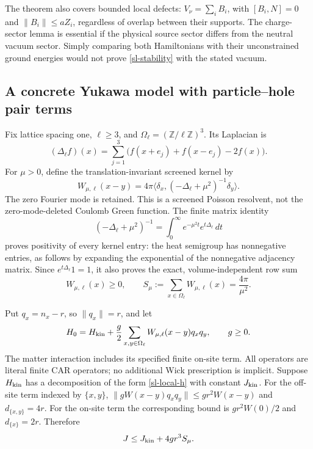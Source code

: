The theorem also covers bounded local defects:
\(V_\nu=\sum_iB_i\), with \([B_i,N]=0\) and
\(\|B_i\|\le aZ_i\), regardless of overlap between their supports.
The charge-sector lemma is essential if the physical source sector
differs from the neutral vacuum sector. Simply comparing both
Hamiltonians with their unconstrained ground energies would not prove
\eqref{sl-stability} with the stated vacuum.

\subsection{A concrete Yukawa model with particle--hole pair terms}
\label{sl-yukawa}

Fix lattice spacing one, \(\ell\ge3\), and
\(\Omega_\ell=(\mathbb Z/\ell\mathbb Z)^3\). Its Laplacian is
\[
(\Delta_\ell f)(x)=\sum_{j=1}^3
\bigl(f(x+e_j)+f(x-e_j)-2f(x)\bigr).
\]
For \(\mu>0\), define the translation-invariant screened kernel by
\begin{equation}
W_{\mu,\ell}(x-y)
=4\pi\langle\delta_x,(-\Delta_\ell+\mu^2)^{-1}\delta_y\rangle.
\label{sl-yukawa-kernel}
\end{equation}
The zero Fourier mode is retained. This is a screened Poisson
resolvent, not the zero-mode-deleted Coulomb Green function. The finite
matrix identity
\[
(-\Delta_\ell+\mu^2)^{-1}
=\int_0^\infty e^{-\mu^2t}e^{t\Delta_\ell}\,dt
\]
proves positivity of every kernel entry: the heat semigroup has
nonnegative entries, as follows by expanding the exponential of the
nonnegative adjacency matrix. Since \(e^{t\Delta_\ell}1=1\), it also
proves the exact, volume-independent row sum
\begin{equation}
W_{\mu,\ell}(x)\ge0,
\qquad
S_\mu:=\sum_{x\in\Omega_\ell}W_{\mu,\ell}(x)
=\frac{4\pi}{\mu^2}.
\label{sl-row-mass}
\end{equation}

Put \(q_x=n_x-r\), so \(\|q_x\|=r\), and let
\begin{equation}
H_0=H_{\rm kin}
 +\frac g2\sum_{x,y\in\Omega_\ell}
 W_{\mu,\ell}(x-y)q_xq_y,
\qquad g\ge0.
\label{sl-concrete-h0}
\end{equation}
The matter interaction includes its specified finite on-site term.
All operators are literal finite CAR operators; no additional Wick
prescription is implicit. Suppose \(H_{\rm kin}\) has a decomposition
of the form \eqref{sl-local-h} with constant \(J_{\rm kin}\).
For the off-site term indexed by \(\{x,y\}\),
\(\|gW(x-y)q_xq_y\|\le gr^2W(x-y)\) and \(d_{\{x,y\}}=4r\).
For the on-site term the corresponding bound is
\(gr^2W(0)/2\) and \(d_{\{x\}}=2r\). Therefore
\begin{equation}
J\le J_{\rm kin}+4gr^3S_\mu.
\label{sl-J-concrete}
\end{equation}

